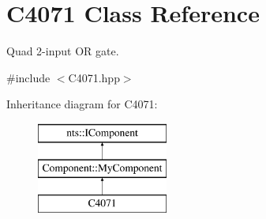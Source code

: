 \hypertarget{classC4071}{}\section{C4071 Class Reference}
\label{classC4071}


Quad 2-\/input OR gate.  




{\ttfamily \#include $<$C4071.\+hpp$>$}

Inheritance diagram for C4071\+:\begin{figure}[H]
\begin{center}
\leavevmode
\includegraphics[height=3.000000cm]{classC4071}
\end{center}
\end{figure}
